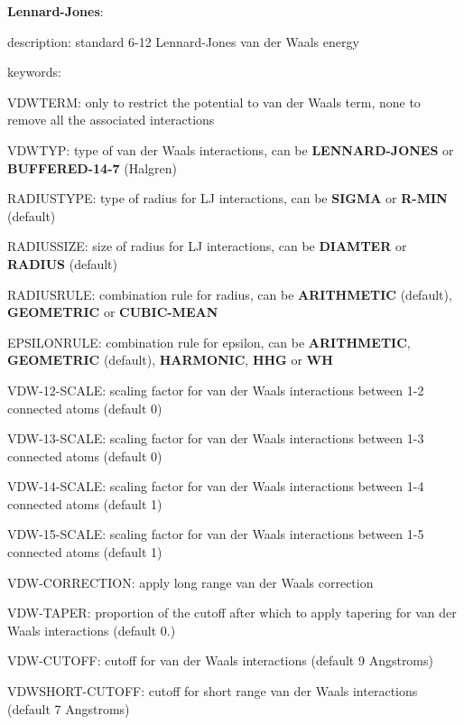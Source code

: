 \begin{DoxyItemize}
\begin{DoxyItemize}
\end{DoxyItemize}
\item {\bfseries Lennard-\/\-Jones}\-:
\begin{DoxyItemize}
\item description\-: standard 6-\/12 Lennard-\/\-Jones van der Waals energy
\item keywords\-:
\begin{DoxyItemize}
\item V\-D\-W\-T\-E\-R\-M\-: only to restrict the potential to van der Waals term, none to remove all the associated interactions
\item V\-D\-W\-T\-Y\-P\-: type of van der Waals interactions, can be {\bfseries L\-E\-N\-N\-A\-R\-D-\/\-J\-O\-N\-E\-S} or {\bfseries B\-U\-F\-F\-E\-R\-E\-D-\/14-\/7} (Halgren)
\item R\-A\-D\-I\-U\-S\-T\-Y\-P\-E\-: type of radius for L\-J interactions, can be {\bfseries S\-I\-G\-M\-A} or {\bfseries R-\/\-M\-I\-N} (default)
\item R\-A\-D\-I\-U\-S\-S\-I\-Z\-E\-: size of radius for L\-J interactions, can be {\bfseries D\-I\-A\-M\-T\-E\-R} or {\bfseries R\-A\-D\-I\-U\-S} (default)
\item R\-A\-D\-I\-U\-S\-R\-U\-L\-E\-: combination rule for radius, can be {\bfseries A\-R\-I\-T\-H\-M\-E\-T\-I\-C} (default), {\bfseries G\-E\-O\-M\-E\-T\-R\-I\-C} or {\bfseries C\-U\-B\-I\-C-\/\-M\-E\-A\-N}
\item E\-P\-S\-I\-L\-O\-N\-R\-U\-L\-E\-: combination rule for epsilon, can be {\bfseries A\-R\-I\-T\-H\-M\-E\-T\-I\-C}, {\bfseries G\-E\-O\-M\-E\-T\-R\-I\-C} (default), {\bfseries H\-A\-R\-M\-O\-N\-I\-C}, {\bfseries H\-H\-G} or {\bfseries W\-H}
\item V\-D\-W-\/12-\/\-S\-C\-A\-L\-E\-: scaling factor for van der Waals interactions between 1-\/2 connected atoms (default 0)
\item V\-D\-W-\/13-\/\-S\-C\-A\-L\-E\-: scaling factor for van der Waals interactions between 1-\/3 connected atoms (default 0)
\item V\-D\-W-\/14-\/\-S\-C\-A\-L\-E\-: scaling factor for van der Waals interactions between 1-\/4 connected atoms (default 1)
\item V\-D\-W-\/15-\/\-S\-C\-A\-L\-E\-: scaling factor for van der Waals interactions between 1-\/5 connected atoms (default 1)
\item V\-D\-W-\/\-C\-O\-R\-R\-E\-C\-T\-I\-O\-N\-: apply long range van der Waals correction
\item V\-D\-W-\/\-T\-A\-P\-E\-R\-: proportion of the cutoff after which to apply tapering for van der Waals interactions (default 0.)
\item V\-D\-W-\/\-C\-U\-T\-O\-F\-F\-: cutoff for van der Waals interactions (default 9 Angstroms)
\item V\-D\-W\-S\-H\-O\-R\-T-\/\-C\-U\-T\-O\-F\-F\-: cutoff for short range van der Waals interactions (default 7 Angstroms)
\end{DoxyItemize}
\end{DoxyItemize}
\end{DoxyItemize}

